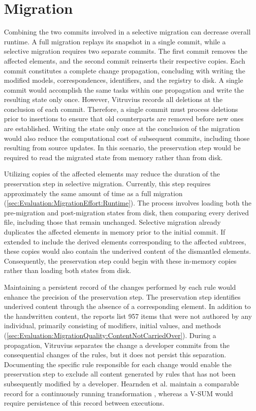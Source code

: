 \section{Migration}
\label{sec:FutureWork:Migration}

Combining the two commits involved in a selective migration can decrease overall runtime.
A full migration replays its snapshot in a single commit, while a selective migration requires two separate commits.
The first commit removes the affected elements, and the second commit reinserts their respective copies.
Each commit constitutes a complete change propagation, concluding with writing the modified models, correspondences, identifiers, and the registry to disk.
A single commit would accomplish the same tasks within one propagation and write the resulting state only once.
However, Vitruvius records all deletions at the conclusion of each commit.
Therefore, a single commit must process deletions prior to insertions to ensure that old counterparts are removed before new ones are established.
Writing the state only once at the conclusion of the migration would also reduce the computational cost of subsequent commits, including those resulting from source updates.
In this scenario, the preservation step would be required to read the migrated state from memory rather than from disk.

Utilizing copies of the affected elements may reduce the duration of the preservation step in selective migration.
Currently, this step requires approximately the same amount of time as a full migration (\autoref{sec:Evaluation:MigrationEffort:Runtime}).
The process involves loading both the pre-migration and post-migration states from disk, then comparing every derived file, including those that remain unchanged.
Selective migration already duplicates the affected elements in memory prior to the initial commit.
If extended to include the derived elements corresponding to the affected subtrees, these copies would also contain the underived content of the dismantled elements.
Consequently, the preservation step could begin with these in-memory copies rather than loading both states from disk.

Maintaining a persistent record of the changes performed by each rule would enhance the precision of the preservation step.
The preservation step identifies underived content through the absence of a corresponding element.
In addition to the handwritten content, the reports list 957 items that were not authored by any individual, primarily consisting of modifiers, initial values, and methods (\autoref{sec:Evaluation:MigrationQuality:ContentNotCarriedOver}).
During a propagation, Vitruvius separates the change a developer commits from the consequential changes of the rules, but it does not persist this separation.
Documenting the specific rule responsible for each change would enable the preservation step to exclude all content generated by rules that has not been subsequently modified by a developer.
Hearnden et al. maintain a comparable record for a continuously running transformation \cite{hearnden2006incremental}, whereas a V-SUM would require persistence of this record between executions.

